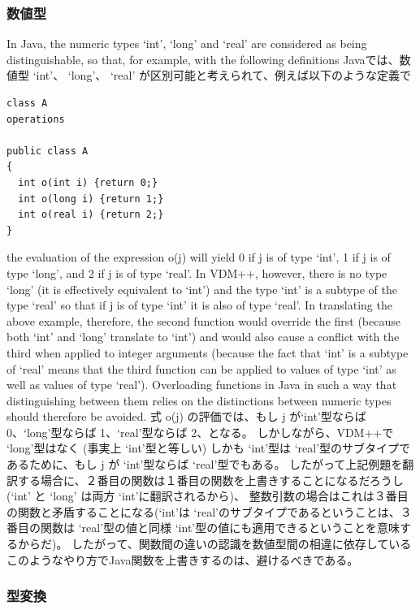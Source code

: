 \documentclass[\pformat,12pt]{jarticle}
\begin{document}
\subsubsection{数値型}

In Java, the numeric types `int', `long' and `real' are considered as
being distinguishable, so that, for example, with the following
definitions 
Javaでは、数値型 `int'、 `long'、 `real' が区別可能と考えられて、例えば以下のような定義で

\begin{small}
\begin{verbatim}
class A
operations

public class A 
{
  int o(int i) {return 0;}
  int o(long i) {return 1;}
  int o(real i) {return 2;}
}
\end{verbatim}
\end{small}

the evaluation of the expression o(j) will yield 0 if j is of type
`int', 1 if j is of type `long', and 2 if j is of type `real'. In
VDM++, however, there is no type `long' (it is effectively equivalent
to `int') and the type `int' is a subtype of the type `real' so that
if j is of type `int' it is also of type `real'. In translating the
above example, therefore, the second function would override the first 
(because both `int' and `long' translate to `int') and would also
cause a conflict with the third when applied to integer arguments
(because the fact that `int' is a subtype of `real' means that the
third function can be applied to values of type `int' as well as
values of type `real'). Overloading functions in Java in such a way
that distinguishing between them relies on the distinctions between
numeric types should therefore be avoided.
式 o(j) の評価では、もし j が`int'型ならば 0、`long'型ならば 1、`real'型ならば 2、となる。 
しかしながら、VDM++で `long'型はなく (事実上 `int'型と等しい) しかも `int'型は `real'型のサブタイプであるために、もし j が `int'型ならば `real'型でもある。 
したがって上記例題を翻訳する場合に、２番目の関数は１番目の関数を上書きすることになるだろうし(`int' と `long' は両方 `int'に翻訳されるから)、 整数引数の場合はこれは３番目の関数と矛盾することになる(`int'は `real'のサブタイプであるということは、３番目の関数は `real'型の値と同様 `int'型の値にも適用できるということを意味するからだ)。
したがって、関数間の違いの認識を数値型間の相違に依存しているこのようなやり方でJava関数を上書きするのは、避けるべきである。

\subsubsection{型変換}
\end{document}
